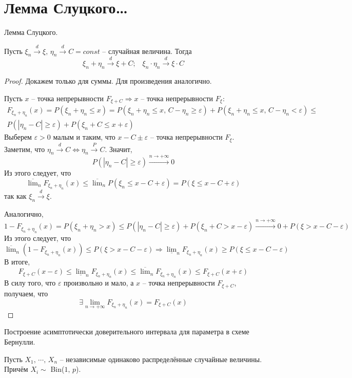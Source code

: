 \section{Лемма Слуцкого\dots}
\begin{theorem}
	Лемма Слуцкого.

	Пусть $\xi_n \stackrel{d}{\to} \xi,\, \eta_n \stackrel{d}{\to} C = const$ -- случайная величина. Тогда
	\[\xi_n + \eta_n \stackrel{d}{\to} \xi + C;\;\;\; \xi_n\cdot\eta_n \stackrel{d}{\to} \xi\cdot C\]
\end{theorem}

\begin{proof}
	Докажем только для суммы. Для произведения аналогично.

	Пусть $x$ -- точка непрерывности $F_{\xi + C} \Rightarrow x$ -- точка непрерывности $F_\xi$:
	\begin{align*}
		F_{\xi_n + \eta_n}(x) = P(\xi_n + \eta_n \leq x) = P(\xi_n + \eta_n \leq x,\, C - \eta_n \geq \varepsilon) + P(\xi_n + \eta_n \leq x,\, C - \eta_n < \varepsilon) \leq \\
		P(|\eta_n - C| \geq \varepsilon) + P(\xi_n + C \leq x + \varepsilon)
	\end{align*}
	Выберем $\varepsilon > 0$ малым и таким, что $x - C \pm \varepsilon$ -- точка непрерывности $F_\xi$. Заметим, что $\eta_n \stackrel{d}{\to} C \Leftrightarrow \eta_n \stackrel{P}{\to} C$. Значит,
	\[P(|\eta_n - C| \geq \varepsilon) \stackrel{n \to +\infty}{\to} 0\]
	Из этого следует, что
	\[\overline{\lim}_n F_{\xi_n + \eta_n}(x) \leq \overline{\lim}_n P(\xi_n \leq x - C + \varepsilon) = P(\xi \leq x - C + \varepsilon)\]
	так как $\xi_n \stackrel{d}{\to} \xi$.

	Аналогично,
	\[1 - F_{\xi_n + \eta_n}(x) = P(\xi_n + \eta_n > x) \leq P(|\eta_n - C| \geq \varepsilon) + P(\xi_n + C > x - \varepsilon) \stackrel{n \to +\infty}{\to} 0 + P(\xi > x - C - \varepsilon)\]
	Из этого следует, что
	\[\overline{\lim}_n(1 - F_{\xi_n + \eta_n}(x)) \leq P(\xi > x - C - \varepsilon) \Rightarrow \underline{\lim}_n F_{\xi_n + \eta_n}(x) \geq P(\xi \leq x - C - \varepsilon)\]
	В итоге,
	\[F_{\xi + C}(x - \varepsilon) \leq \underline{\lim}_nF_{\xi_n + \eta_n}(x) \leq \overline{\lim}_n F_{\xi_n + \eta_n}(x) \leq F_{\xi + C}(x + \varepsilon)\]
	В силу того, что $\varepsilon$ произвольно и мало, а $x$ -- точка непрерывности $F_{\xi + C}$, получаем, что
	\[\exists \lim_{n \to +\infty}F_{\xi_n + \eta_n}(x) = F_{\xi + C}(x)\]
\end{proof}

\begin{example}
	Построение асимптотически доверительного интервала для параметра в схеме Бернулли.

	Пусть $X_1,\,\cdots,\,X_n$ -- независимые одинаково распределённые случайные величины. Причём $X_i \sim$ Bin($1,\,p$).
\end{example}

